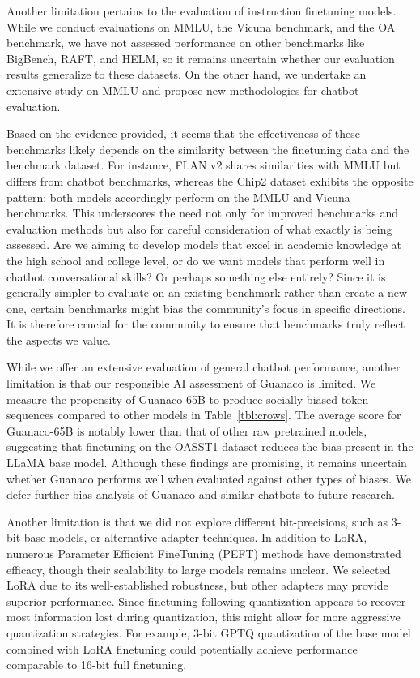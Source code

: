 Another limitation pertains to the evaluation of instruction finetuning models. While we conduct evaluations on MMLU, the Vicuna benchmark, and the OA benchmark, we have not assessed performance on other benchmarks like BigBench, RAFT, and HELM, so it remains uncertain whether our evaluation results generalize to these datasets. On the other hand, we undertake an extensive study on MMLU and propose new methodologies for chatbot evaluation.

Based on the evidence provided, it seems that the effectiveness of these benchmarks likely depends on the similarity between the finetuning data and the benchmark dataset. For instance, FLAN v2 shares similarities with MMLU but differs from chatbot benchmarks, whereas the Chip2 dataset exhibits the opposite pattern; both models accordingly perform on the MMLU and Vicuna benchmarks. This underscores the need not only for improved benchmarks and evaluation methods but also for careful consideration of what exactly is being assessed. Are we aiming to develop models that excel in academic knowledge at the high school and college level, or do we want models that perform well in chatbot conversational skills? Or perhaps something else entirely? Since it is generally simpler to evaluate on an existing benchmark rather than create a new one, certain benchmarks might bias the community’s focus in specific directions. It is therefore crucial for the community to ensure that benchmarks truly reflect the aspects we value.

While we offer an extensive evaluation of general chatbot performance, another limitation is that our responsible AI assessment of {Guanaco} is limited. We measure the propensity of {Guanaco}-65B to produce socially biased token sequences compared to other models in Table~\ref{tbl:crows}. The average score for {Guanaco}-65B is notably lower than that of other raw pretrained models, suggesting that finetuning on the OASST1 dataset reduces the bias present in the LLaMA base model. Although these findings are promising, it remains uncertain whether {Guanaco} performs well when evaluated against other types of biases. We defer further bias analysis of {Guanaco} and similar chatbots to future research.

Another limitation is that we did not explore different bit-precisions, such as 3-bit base models, or alternative adapter techniques. In addition to LoRA, numerous Parameter Efficient FineTuning (PEFT) methods have demonstrated efficacy, though their scalability to large models remains unclear. We selected LoRA due to its well-established robustness, but other adapters may provide superior performance. Since finetuning following quantization appears to recover most information lost during quantization, this might allow for more aggressive quantization strategies. For example, 3-bit GPTQ quantization of the base model combined with LoRA finetuning could potentially achieve performance comparable to 16-bit full finetuning.

